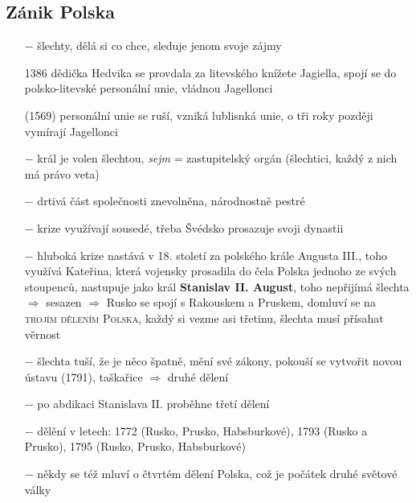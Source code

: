 \documentclass{article}
\begin{document}
\subsection*{Zánik Polska}
\begin{itemize}
    \vspace{-0.5em}
    \setlength\itemsep{0.15em}
    \item[$-$]  šlechty, dělá si co chce, sleduje jenom svoje zájmy
    \item[1386] dědička Hedvika se provdala za litevského knížete Jagiella, spojí se do polsko-litevské personální unie, vládnou Jagellonci
    \item[(1569)] personální unie se ruší, vzniká lublisnká unie, o tři roky později vymírají Jagellonci
    \item[$-$] král je volen šlechtou, \textit{sejm} = zastupitelský orgán (šlechtici, každý z nich má právo veta)
    \item[$-$] drtivá část společnosti znevolněna, národnostně pestré
    \item[$-$] krize využívají sousedé, třeba Švédsko prosazuje svoji dynastii
    \item[$-$] hluboká krize nastává v 18. století za polského krále Augusta III., toho využívá Kateřina, která vojensky prosadila do čela Polska jednoho ze svých stoupenců, nastupuje jako král \textbf{Stanislav II. August}, toho nepřijímá šlechta $\Rightarrow$ sesazen $\Rightarrow$ Rusko se spojí s Rakouskem a Pruskem, domluví se na \textsc{trojím dělením Polska}, každý si vezme asi třetinu, šlechta musí přísahat věrnost
    \item[$-$] šlechta tuší, že je něco špatně, mění své zákony, pokouší se vytvořit novou ústavu (1791), taškařice $\Rightarrow$ druhé dělení
    \item[$-$] po abdikaci Stanislava II. proběhne třetí dělení
    \item[$-$] dělění v letech: 1772 (Rusko, Prusko, Habsburkové), 1793 (Rusko a Prusko), 1795 (Rusko, Prusko, Habsburkové)
    \item[$-$] někdy se též mluví o čtvrtém dělení Polska, což je počátek druhé světové války
\end{itemize}
\end{document}
